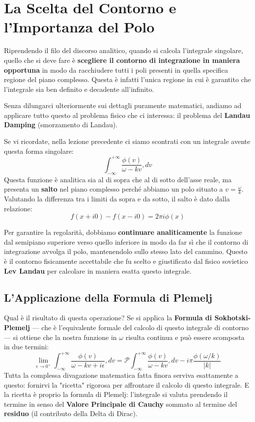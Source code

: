\section{La Scelta del Contorno e l'Importanza del Polo}

Riprendendo il filo del discorso analitico, quando si calcola l'integrale singolare, quello che si deve fare è \textbf{scegliere il contorno di integrazione in maniera opportuna} in modo da racchiudere tutti i poli presenti in quella specifica regione del piano complesso. Questa è infatti l'unica regione in cui è garantito che l'integrale sia ben definito e decadente all'infinito.

Senza dilungarci ulteriormente sui dettagli puramente matematici, andiamo ad applicare tutto questo al problema fisico che ci interessa: il problema del \textbf{Landau Damping} (smorzamento di Landau).

Se vi ricordate, nella lezione precedente ci siamo scontrati con un integrale avente questa forma singolare:
\begin{equation}
\int_{-\infty}^{+\infty} \frac{\phi(v)}{\omega - kv} , dv
\end{equation}
Questa funzione è analitica sia al di sopra che al di sotto dell'asse reale, ma presenta un \textbf{salto} nel piano complesso perché abbiamo un polo situato a $v = \frac{\omega}{k}$. Valutando la differenza tra i limiti da sopra e da sotto, il salto è dato dalla relazione:
\begin{equation}
f(x + i0) - f(x - i0) = 2\pi i \phi(x)
\end{equation}

Per garantire la regolarità, dobbiamo \textbf{continuare analiticamente} la funzione dal semipiano superiore verso quello inferiore in modo da far sì che il contorno di integrazione avvolga il polo, mantenendolo sullo stesso lato del cammino.
Questo è il contorno fisicamente accettabile che fu scelto e giustificato dal fisico sovietico \textbf{Lev Landau} per calcolare in maniera esatta questo integrale.

\subsection{L'Applicazione della Formula di Plemelj}
Qual è il risultato di questa operazione? Se si applica la \textbf{Formula di Sokhotski-Plemelj} — che è l'equivalente formale del calcolo di questo integrale di contorno — si ottiene che la nostra funzione in $\omega$ risulta continua e può essere scomposta in due termini:
\begin{equation}
\lim_{\epsilon \to 0^+} \int_{-\infty}^{+\infty} \frac{\phi(v)}{\omega - kv + i\epsilon} , dv = \mathcal{P} \int_{-\infty}^{+\infty} \frac{\phi(v)}{\omega - kv} , dv - i\pi \frac{\phi(\omega/k)}{|k|}
\end{equation}
Tutta la complessa divagazione matematica fatta finora serviva esattamente a questo: fornirvi la "ricetta" rigorosa per affrontare il calcolo di questo integrale. E la ricetta è proprio la formula di Plemelj: l'integrale si valuta prendendo il termine in senso del \textbf{Valore Principale di Cauchy} sommato al termine del \textbf{residuo} (il contributo della Delta di Dirac).

